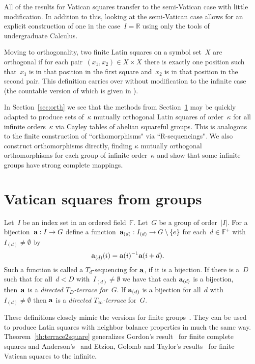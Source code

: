 \documentclass[12pt,a4paper]{article}
\newcommand{\R}{\mathbb{R}}
\newcommand{\F}{\mathbb{F}}
\renewcommand{\a}{\textup{\textbf{a}}}
\begin{document}
All of the results for Vatican squares transfer to the semi-Vatican case with little modification.  In addition to this, looking at the semi-Vatican case allows for an explicit construction of one in the case~$I = \R$ using only the tools of undergraduate Calculus.


Moving to orthogonality, two finite Latin squares on a symbol set~$X$ are orthogonal if for  each pair~$(x_1, x_2) \in X \times X$ there is exactly one position such that~$x_1$ is in that position in the first square and~$x_2$ is in that position in the second pair.  This definition carries over without modification to the infinite case (the countable version of which is given in \cite[p.~116]{DK15}).

In Section~\ref{sec:orth} we see that the methods from Section~\ref{sec:cayley} may be quickly adapted to produce sets of~$\kappa$ mutually orthogonal Latin squares of order~$\kappa$ for all infinite orders~$\kappa$ via Cayley tables of abelian squareful groups.  This is analogous to the finite construction of ``orthomorphisms" via ``R-sequencings".   We also construct orthomorphisms directly, finding $\kappa$ mutually orthogonal orthomorphisms for each group of infinite order~$\kappa$ and show that some infinite groups have strong complete mappings.


\section{Vatican squares from groups}\label{sec:cayley}


Let~$I$ be an index set in an ordered field~$\F$.  Let~$G$ be a group of order~$|I|$.  For a bijection~${\bf a}: I \rightarrow G$ define a function~${\bf a}_{(d)}: I_{(d)} \rightarrow G \setminus \{ e \}$ for each~$d \in \F^+$ with~$I_{(d)} \neq \emptyset$ by
$${\bf a}_{(d)}(i) = {\bf a}(i)^{-1}{\bf a}(i+d).$$ Such a function is called a $T_d$-sequencing for $\a$, if it is a bijection.
If there is a~$D$ such that for all~$d < D$ with~$I_{(d)} \neq \emptyset$ we have that each ${\bf a}_{(d)}$ is a bijection, then~${\bf a}$ is a {\em directed $T_D$-terrace for~$G$}.  If ${\bf a}_{(d)}$ is a bijection for all~$d$  with~$I_{(d)} \neq \emptyset$ then ${\bf a}$ is  a {\em directed $T_{\infty}$-terrace} for~$G$.

These definitions closely mimic the versions for finite groups~\cite{Anderson90}.   They can be used to produce Latin squares with neighbor balance properties in much the same way.  Theorem~\ref{th:terrace2square} generalizes Gordon's result~\cite{Gordon61} for finite complete squares and Anderson's~\cite{Anderson90} and Etzion, Golomb and Taylor's results~\cite{EGT89} for finite Vatican squares to the infinite.  
\end{document}
